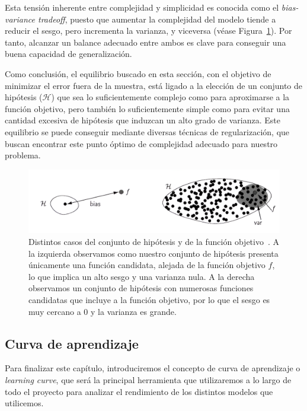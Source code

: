 Esta tensión inherente entre complejidad y simplicidad es conocida como el \textit{bias-variance tradeoff}, puesto que aumentar la complejidad del modelo tiende a reducir el sesgo, pero incrementa la varianza, y viceversa (véase Figura~\ref{fig:bias-variance}). Por tanto, alcanzar un balance adecuado entre ambos es clave para conseguir una buena capacidad de generalización.

Como conclusión, el equilibrio buscado en esta sección, con el objetivo de minimizar el error fuera de la muestra, está ligado a la elección de un conjunto de hipótesis ($\mathcal{H}$) que sea lo suficientemente complejo como para aproximarse a la función objetivo, pero también lo suficientemente simple como para evitar una cantidad excesiva de hipótesis que induzcan un alto grado de varianza. Este equilibrio se puede conseguir mediante diversas técnicas de regularización, que buscan encontrar este punto óptimo de complejidad adecuado para nuestro problema.


\begin{figure}[h]
    \centering
    \includegraphics[width=0.7\linewidth]{img/bias-variance.png}
    \caption[Distintos casos del conjunto de hipótesis y de la función objetivo.] {Distintos casos del conjunto de hipótesis y de la función objetivo~\cite{Mostafa2012}. A la izquierda observamos como nuestro conjunto de hipótesis presenta únicamente una función candidata, alejada de la función objetivo $f$, lo que implica un alto sesgo y una varianza nula. A la derecha observamos un conjunto de hipótesis con numerosas funciones candidatas que incluye a la función objetivo, por lo que el sesgo es muy cercano a $0$ y la varianza es grande.}\label{fig:bias-variance}
\end{figure}

\subsection{Curva de aprendizaje}

Para finalizar este capítulo, introduciremos el concepto de curva de aprendizaje o \emph{learning curve}, que será la principal herramienta que utilizaremos a lo largo de todo el proyecto para analizar el rendimiento de los distintos modelos que utilicemos.

